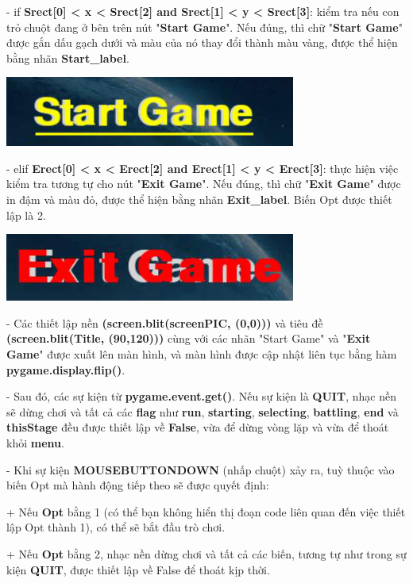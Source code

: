 \documentclass[a4paper]{article}
\begin{document}
- if \textbf{Srect{[}0{]} \textless{} x \textless{} Srect{[}2{]} and
Srect{[}1{]} \textless{} y \textless{} Srect{[}3{]}}: kiểm tra nếu con
trỏ chuột đang ở bên trên nút "\textbf{Start Game}". Nếu đúng, thì chữ "\textbf{Start Game}" được gắn dấu gạch dưới và màu của nó thay đổi thành màu vàng, được thể hiện bằng nhãn \textbf{Start\_label}.

\includegraphics[width=3.75833in,height=0.90555in]{image17.png}

- elif \textbf{Erect{[}0{]} \textless{} x \textless{} Erect{[}2{]} and
Erect{[}1{]} \textless{} y \textless{} Erect{[}3{]}}: thực hiện việc kiểm tra tương tự cho nút "\textbf{Exit Game}". Nếu đúng, thì chữ "\textbf{Exit Game}" được in đậm và màu đỏ, được thể hiện bằng nhãn \textbf{Exit\_label}. Biến Opt được thiết lập là 2.

\includegraphics[width=3.75972in,height=0.875in]{image31.png}

- Các thiết lập nền \textbf{(screen.blit(screenPIC, (0,0)))} và tiêu đề \textbf{(screen.blit(Title, (90,120)))} cùng với các nhãn "Start Game" và "\textbf{Exit Game}" được xuất lên màn hình, và màn hình được cập nhật liên tục bằng hàm \textbf{pygame.display.flip()}.

- Sau đó, các sự kiện từ \textbf{pygame.event.get()}. Nếu sự kiện là \textbf{QUIT}, nhạc nền sẽ dừng chơi và tất cả các \textbf{flag} như \textbf{run}, \textbf{starting}, \textbf{selecting}, \textbf{battling}, \textbf{end} và \textbf{thisStage} đều được thiết lập về \textbf{False}, vừa để dừng vòng lặp và vừa để thoát khỏi \textbf{menu}.

- Khi sự kiện \textbf{MOUSEBUTTONDOWN} (nhấp chuột) xảy ra, tuỳ thuộc vào biến
Opt mà hành động tiếp theo sẽ được quyết định:

+ Nếu \textbf{Opt} bằng 1 (có thể bạn không hiển thị đoạn code liên quan đến việc thiết lập Opt thành 1), có thể sẽ bắt đầu trò chơi.

+ Nếu \textbf{Opt} bằng 2, nhạc nền dừng chơi và tất cả các biến, tương tự như
trong sự kiện \textbf{QUIT}, được thiết lập về False để thoát kịp thời.
\end{document}
